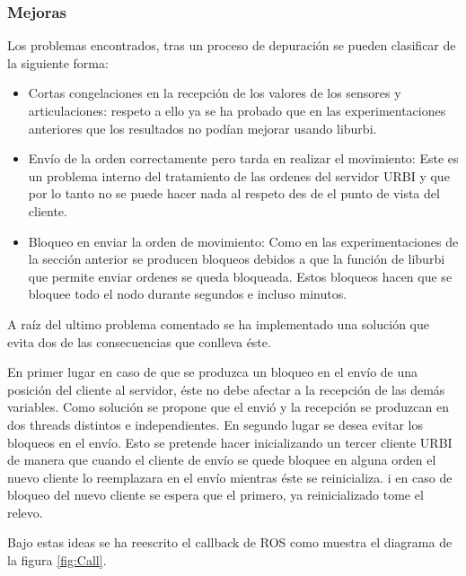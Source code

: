 \documentclass[12pt,a4paper,final,twoside]{article}
\begin{document}
\subsubsection{Mejoras}
Los problemas encontrados, tras un proceso de depuración se pueden clasificar de la siguiente forma:
\begin{itemize}
\item Cortas congelaciones en la recepción de los valores de los sensores y articulaciones: respeto a ello ya se ha probado que en las experimentaciones anteriores que los resultados no podían mejorar usando liburbi.
\item Envío de la orden correctamente pero tarda en realizar el movimiento: Este es un problema interno del tratamiento de las ordenes del servidor URBI y que por lo tanto no se puede hacer nada al respeto des de el punto de vista del cliente.
\item Bloqueo en enviar la orden de movimiento: Como en las experimentaciones de la sección anterior se producen bloqueos debidos a que la función de liburbi que permite enviar ordenes se queda bloqueada. Estos bloqueos hacen que se bloquee todo el nodo durante segundos e incluso minutos.
\end{itemize}

A raíz del ultimo problema comentado se ha implementado una solución que evita dos de las consecuencias que conlleva éste.

En primer lugar en caso de que se produzca un bloqueo en el envío de una posición del cliente al servidor, éste no debe afectar a la recepción de las demás variables. Como solución se propone que el envió y la recepción se produzcan en dos threads distintos e independientes. 
En segundo lugar se desea evitar los bloqueos en el envío. Esto se pretende hacer inicializando un tercer cliente URBI de manera que cuando el cliente de envío se quede bloquee en alguna orden el nuevo cliente lo reemplazara en el envío mientras éste se reinicializa. i en caso de bloqueo del nuevo cliente se espera que el primero, ya reinicializado tome el relevo.

Bajo estas ideas se ha reescrito el callback de ROS como muestra el diagrama de la figura \ref{fig:Call}.
\end{document}
